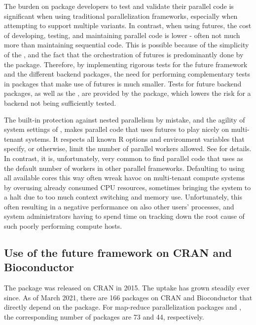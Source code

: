 The burden on package developers to test and validate their parallel
code is significant when using traditional parallelization frameworks,
especially when attempting to support multiple variants.  In contrast,
when using futures, the cost of developing, testing, and maintaining
parallel code is lower - often not much more than maintaining
sequential code.  This is possible because of the simplicity of the
, and the fact that the orchestration of futures is
predominantly done by the  package.  Therefore, by
implementing rigorous tests for the future framework and the different
backend packages, the need for performing complementary tests in
packages that make use of futures is much smaller.  Tests for future
backend packages, as well as the , are provided by
the  package, which lowers the risk for a backend
not being sufficiently tested.

The built-in protection against nested parallelism by mistake, and the
agility of system settings of , makes parallel
code that uses futures to play nicely on multi-tenant systems.  It
respects all known R options and environment variables that specify,
or otherwise, limit the number of parallel workers allowed.
See  for
details.  In contrast, it is, unfortunately, very common to find
parallel code that uses  as the default
number of workers in other parallel frameworks.  Defaulting to using
all available cores this way often wreak havoc on multi-tenant compute
systems by overusing already consumed CPU resources, sometimes
bringing the system to a halt due to too much context switching and
memory use.  Unfortunately, this often resulting in a negative
performance on also other users' processes, and system administrators
having to spend time on tracking down the root cause of such poorly
performing compute hosts.


\subsection{Use of the future framework on CRAN and Bioconductor}
\label{use-of-the-future-framework}

The  package was released on CRAN in 2015. The uptake has
grown steadily ever since.  As of March 2021, there are 166 packages
on CRAN and Bioconductor that directly depend on the 
package.  For map-reduce parallelization packages 
and , the corresponding number of packages are 73 and 44,
respectively.

